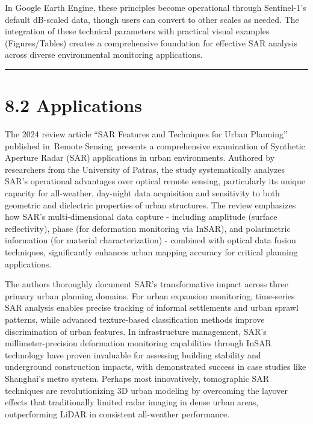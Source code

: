 \documentclass[
  letterpaper,
  DIV=11,
  numbers=noendperiod]{scrreprt}
\begin{document}
In Google Earth Engine, these principles become operational through
Sentinel-1's default dB-scaled data, though users can convert to other
scales as needed. The integration of these technical parameters with
practical visual examples (Figures/Tables) creates a comprehensive
foundation for effective SAR analysis across diverse environmental
monitoring applications.

\begin{center}\rule{0.5\linewidth}{0.5pt}\end{center}

\section{8.2 Applications}\label{applications-5}

The 2024 review article ``SAR Features and Techniques for Urban
Planning'' published in~Remote Sensing~presents a comprehensive
examination of Synthetic Aperture Radar (SAR) applications in urban
environments. Authored by researchers from the University of Patras, the
study systematically analyzes SAR's operational advantages over optical
remote sensing, particularly its unique capacity for all-weather,
day-night data acquisition and sensitivity to both geometric and
dielectric properties of urban structures. The review emphasizes how
SAR's multi-dimensional data capture - including amplitude (surface
reflectivity), phase (for deformation monitoring via InSAR), and
polarimetric information (for material characterization) - combined with
optical data fusion techniques, significantly enhances urban mapping
accuracy for critical planning applications.

The authors thoroughly document SAR's transformative impact across three
primary urban planning domains. For urban expansion monitoring,
time-series SAR analysis enables precise tracking of informal
settlements and urban sprawl patterns, while advanced texture-based
classification methods improve discrimination of urban features. In
infrastructure management, SAR's millimeter-precision deformation
monitoring capabilities through InSAR technology have proven invaluable
for assessing building stability and underground construction impacts,
with demonstrated success in case studies like Shanghai's metro system.
Perhaps most innovatively, tomographic SAR techniques are
revolutionizing 3D urban modeling by overcoming the layover effects that
traditionally limited radar imaging in dense urban areas, outperforming
LiDAR in consistent all-weather performance.
\end{document}
